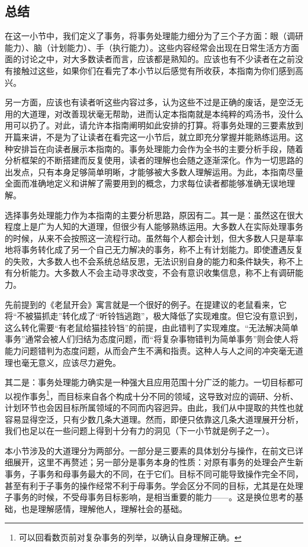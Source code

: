 \subsection{总结}
在这一小节中，我们定义了事务，将事务处理能力细分为了三个子方面：眼（调研能力）、脑（计划能力）、手（执行能力）。这些内容经常会出现在日常生活方方面面的讨论之中，对大多数读者而言，应该都是熟知的。应该也有不少读者在之前没有接触过这些，如果你们在看完了本小节以后感觉有所收获，本指南为你们感到高兴。

另一方面，应该也有读者听这些内容过多，认为这些不过是正确的废话，是空泛无用的大道理，对改善现状毫无帮助，进而认定本指南就是本纯粹的鸡汤书，没什么用可以扔了。对此，请允许本指南阐明如此安排的打算。将事务处理的三要素放到开篇来讲，不是为了让读者在看完这一小节后，就立即充分掌握并能熟练运用。这种安排旨在向读者展示本指南的。事务处理能力会作为全书的主要分析手段，随着分析框架的不断搭建而反复使用，读者的理解也会随之逐渐深化。作为一切思路的出发点，只有本身足够简单明晰，才能够被大多数人理解运用。为此，本指南尽量全面而准确地定义和讲解了需要用到的概念，力求每位读者都能够准确无误地理解。

选择事务处理能力作为本指南的主要分析思路，原因有二。其一是：虽然这在很大程度上是广为人知的大道理，但很少有人能够熟练运用。大多数人在实际处理事务的时候，从来不会按照这一流程行动。虽然每个人都会计划，但大多数人只是草率地将事务转化成了另一个自己无力解决的事务，称不上有计划能力。即使遭遇反复的失败，大多数人也不会系统总结反思，无法识别自身的能力和条件缺失，称不上有分析能力。大多数人不会主动寻求改变，不会有意识收集信息，称不上有调研能力。
\begin{examples}
先前提到的《老鼠开会》寓言就是一个很好的例子。在提建议的老鼠看来，它将“不被猫抓走”转化成了“听铃铛逃跑”，极大降低了实现难度。但它没有意识到，这么转化需要“有老鼠给猫挂铃铛”的前提，由此错判了实现难度。“无法解决简单事务”通常会被人们归结为态度问题，而“将复杂事物错判为简单事务”则会使人将能力问题错判为态度问题，从而会产生不满和指责。这种人与人之间的冲突毫无道理也毫无意义，应该尽力避免。
\end{examples}
其二是：事务处理能力确实是一种强大且应用范围十分广泛的能力。一切目标都可以视作事务\footnote{可以回看数页前对复杂事务的列举，以确认自身理解正确。}，而目标来自各个构成十分不同的领域，这导致对应的调研、分析、计划环节也会因目标所属领域的不同而内容迥异。由此，我们从中提取的共性也就容易显得空泛，只有少数几条大道理。然而，即便只依靠这几条大道理展开分析，我们也足以在一些问题上得到十分有力的洞见（下一小节就是例子之一）。

本小节涉及的大道理分为两部分。一部分是三要素的具体划分与操作，在前文已详细展开，这里不再赘述；另一部分是事务本身的性质：对原有事务的处理会产生新事务，子事务和母事务最大的不同，在于它们。目标不同可能导致操作完全不同，甚至有利于子事务的操作经常不利于母事务。学会区分不同的目标，尤其是在处理子事务的时候，不受母事务目标影响，是相当重要的能力——。这是换位思考的基础，也是理解感情，理解他人，理解社会的基础。

